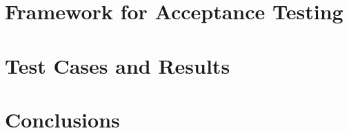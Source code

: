 \documentclass[11pt,fleqn]{book} %
\begin{document}
\chapter{Framework for Acceptance Testing}
   \label{chap:acc-framework}
   
   \cleardoublepage
\chapter{Test Cases and Results}
   \label{chap:acc-tests}
   
   \cleardoublepage
\chapter{Conclusions}
   \label{chap:acc-conclusions}
   
   \cleardoublepage

%    

%    


%    
%    
\end{document}
